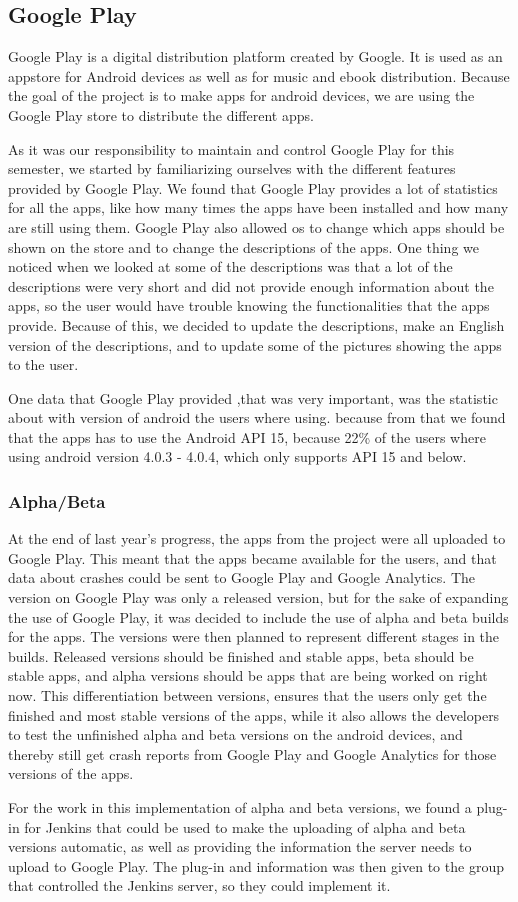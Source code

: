 \subsection{Google Play}
Google Play is a digital distribution platform created by Google. It is used as an appstore for Android devices as well as for music and ebook distribution. Because the goal of the project is to make apps for android devices, we are using the Google Play store to distribute the different apps. 

As it was our responsibility to maintain and control Google Play for this semester, we started by familiarizing ourselves with the different features provided by Google Play. We found that Google Play provides a lot of statistics for all the apps, like how many times the apps have been installed and how many are still using them. Google Play also allowed os to change which apps should be shown on the store and to change the descriptions of the apps. One thing we noticed when we looked at some of the descriptions was that a lot of the descriptions were very short and did not provide enough information about the apps, so the user would have trouble knowing the functionalities that the apps provide. Because of this, we decided to update the descriptions, make an English version of the descriptions, and to update some of the pictures showing the apps to the user.

One data that Google Play provided ,that was very important, was the statistic about with version of android the users where using. because from that we found that the apps has to use the Android API 15, because 22\% of the users where using android version 4.0.3 - 4.0.4, which only supports API 15 and below. 

\subsubsection{Alpha/Beta}
At the end of last year’s progress, the apps from the project were all uploaded to Google Play. This meant that the apps became available for the users, and that data about crashes could be sent to Google Play and Google Analytics. The version on Google Play was only a released version, but for the sake of expanding the use of Google Play, it was decided to include the use of alpha and beta builds for the apps. The versions were then planned to represent different stages in the builds. Released versions should be finished and stable apps, beta should be stable apps, and alpha versions should be apps that are being worked on right now. This differentiation between versions, ensures that the users only get the finished and most stable versions of the apps, while it also allows the developers to test the unfinished alpha and beta versions on the android devices, and thereby still get crash reports from Google Play and Google Analytics for those versions of the apps.

For the work in this implementation of alpha and beta versions, we found a plug-in for Jenkins that could be used to make the uploading of alpha and beta versions automatic, as well as providing the information the server needs to upload to Google Play. The plug-in and information was then given to the group that controlled the Jenkins server, so they could implement it. 